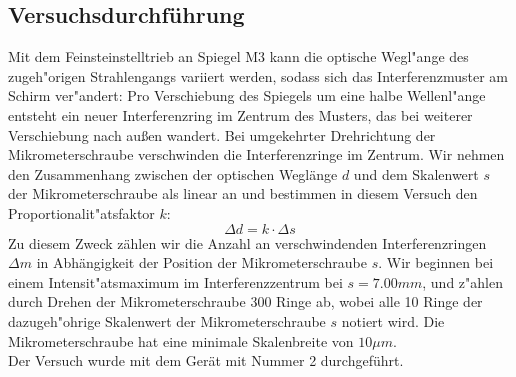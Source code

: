 \documentclass[12pt,a4paper]{article}
\begin{document}
\subsection{Versuchsdurchführung}
Mit dem Feinsteinstelltrieb an Spiegel M3 kann die optische Wegl"ange des zugeh"origen Strahlengangs variiert werden, sodass sich das Interferenzmuster am Schirm ver"andert: Pro Verschiebung des Spiegels um eine halbe Wellenl"ange entsteht ein neuer Interferenzring im Zentrum des Musters, das bei weiterer Verschiebung nach au\ss en wandert. Bei umgekehrter Drehrichtung der Mikrometerschraube verschwinden die Interferenzringe im Zentrum. Wir nehmen den Zusammenhang zwischen der optischen Weglänge $d$ und dem Skalenwert $s$ der Mikrometerschraube als linear an und bestimmen in diesem Versuch den Proportionalit"atsfaktor $k$:
\begin{equation}\label{eq:d=ks}
\Delta d=k\cdot \Delta s
\end{equation}
Zu diesem Zweck zählen wir die Anzahl an verschwindenden Interferenzringen $\Delta m$ in Abhängigkeit der Position der Mikrometerschraube $s$.
Wir beginnen bei einem Intensit"atsmaximum im Interferenzzentrum bei $s=7.00mm$, und z"ahlen durch Drehen der Mikrometerschraube 300 Ringe ab, wobei alle 10 Ringe der dazugeh"ohrige Skalenwert der Mikrometerschraube $s$ notiert wird. Die Mikrometerschraube hat eine minimale Skalenbreite von $10\mu m$.\\
Der Versuch wurde mit dem Gerät mit Nummer 2 durchgeführt.
\end{document}
